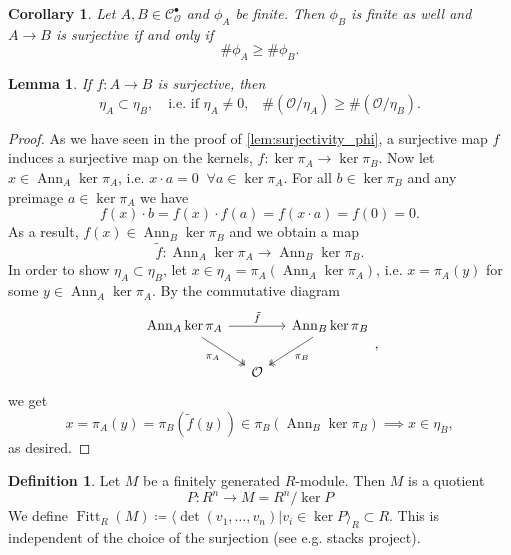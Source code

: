 \documentclass{article}
\theoremstyle{plain}%
\newtheorem{lemma}{Lemma}[section]
\newtheorem{corollary}{Corollary}[section]
\theoremstyle{definition}
\newtheorem{definition}{Definition}[section]
\theoremstyle{remark}
\newcommand{\cob}{\mathcal{C}_\mathcal{O}^\bullet}
\newcommand{\ann}{\operatorname{Ann}}
\newcommand{\fitt}{\operatorname{Fitt}}
\begin{document}
\begin{corollary}\label{cor:surjectivity_phi}
    Let \(A, B\in \cob\) and \(\phi_A\) be finite. Then \(\phi_B\) is finite as well
    and \(A \to B\) is surjective if and only if \[\# \phi_A \geq \# \phi_B.\]
\end{corollary}

\begin{lemma}\label{lem:surjectivity_eta}
    If \(f \colon A \to B\) is surjective, then
    \begin{equation}
        \eta_A \subset \eta_B, \quad \text{i.e. if \(\eta_A \neq 0\),}\quad \#(\mathcal{O}/\eta_A) \geq \#(\mathcal{O}/\eta_B).  
    \end{equation}
\end{lemma}
\begin{proof}
    As we have seen in the proof of \cref{lem:surjectivity_phi}, a surjective map \(f\) induces a surjective
    map on the kernels, \(f\colon \ker \pi_A \to \ker\pi_B\).
    Now let \(x \in \ann_A \ker \pi_A\), i.e. \(x \cdot a = 0\;\; \forall a \in \ker \pi_A\).
    For all \(b \in \ker \pi_B\) and any preimage \(a \in \ker \pi_A\) we have
    \[
        f(x) \cdot b = f(x) \cdot f(a) = f(x \cdot a) = f(0) = 0.
    \]
    As a result, \(f(x) \in \ann_B\ker \pi_B\) and we obtain a map
    \[
        \tilde f\colon\ann_A\ker \pi_A \to \ann_B \ker \pi_B.  
    \]
    In order to show \(\eta_A \subset \eta_B\), let \(x \in \eta_A = \pi_A(\ann_A \ker \pi_A)\), i.e.
    \(x = \pi_A(y)\) for some \(y \in \ann_A \ker \pi_A\). By the commutative diagram
    \[
    \begin{tikzcd}[column sep=small]
        \ann_A \ker \pi_A \arrow[rr, "\tilde f"] \arrow [dr, "\pi_A", swap, twoheadrightarrow] 
        & & \ann_B \ker \pi_B \arrow [dl, "\pi_B", twoheadrightarrow]\\
        & \mathcal{O} &
    \end{tikzcd},
    \]
    we get
    \[
        x = \pi_A(y) = \pi_B(\tilde f(y)) \in \pi_B(\ann_B \ker \pi_B) \implies x \in \eta_B,
    \]
    as desired.
\end{proof}

\begin{definition}
    Let \(M\) be a finitely generated \(R\)-module. Then \(M\) is a quotient
    \[
        P \colon R^n \longrightarrow M = R^n/\ker P
    \]
    We define \(\fitt_R(M) \coloneqq \langle \det(v_1, \dots, v_n) | v_i \in \ker P \rangle_R \subset R\).
    This is independent of the choice of the surjection (see e.g. stacks project).
\end{definition}
\end{document}
